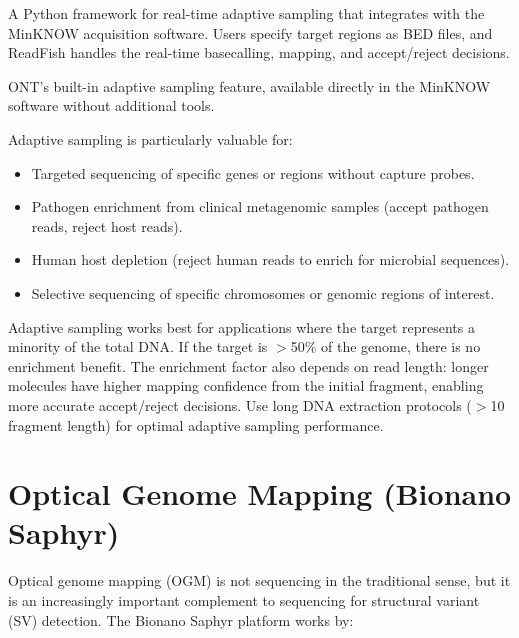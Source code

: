 \begin{description}[style=nextline, itemsep=3pt]
  \item[\software{ReadFish}] A Python framework for real-time adaptive sampling that integrates with the MinKNOW acquisition software. Users specify target regions as BED files, and ReadFish handles the real-time basecalling, mapping, and accept/reject decisions.

  \item[\software{MinKNOW adaptive sampling}] ONT's built-in adaptive sampling feature, available directly in the MinKNOW software without additional tools.

  \item[Applications] Adaptive sampling is particularly valuable for:
  \begin{itemize}[itemsep=2pt]
    \item Targeted sequencing of specific genes or regions without capture probes.
    \item Pathogen enrichment from clinical metagenomic samples (accept pathogen reads, reject host reads).
    \item Human host depletion (reject human reads to enrich for microbial sequences).
    \item Selective sequencing of specific chromosomes or genomic regions of interest.
  \end{itemize}
\end{description}

\begin{tipbox}
Adaptive sampling works best for applications where the target represents a minority of the total DNA. If the target is $>$50\% of the genome, there is no enrichment benefit. The enrichment factor also depends on read length: longer molecules have higher mapping confidence from the initial fragment, enabling more accurate accept/reject decisions. Use long DNA extraction protocols ($>$10\kilobase{} fragment length) for optimal adaptive sampling performance.
\end{tipbox}


\section{Optical Genome Mapping (Bionano Saphyr)}
\label{sec:specialized:ogm}

Optical genome mapping (OGM) is not sequencing in the traditional sense, but it is an increasingly important complement to sequencing for structural variant (SV) detection. The Bionano Saphyr platform works by:

